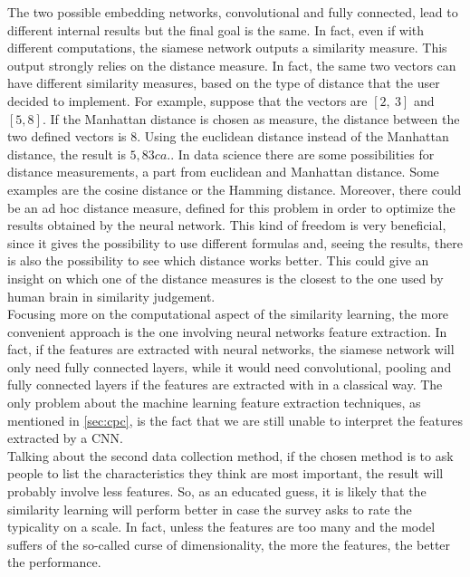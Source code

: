 \documentclass[conference]{IEEEtran}
\begin{document}
			\noindent The two possible embedding networks, convolutional and fully connected, lead to different internal results but the final goal is the same. In fact, even if with different computations, the siamese 
			network outputs a similarity measure. This output strongly relies on the distance measure. In fact, the same two vectors can have different similarity measures, based on the type of distance that the user 
			decided to implement. For example, suppose that the vectors are $[2,\ 3]$ and $[5, 8]$. If the Manhattan distance is chosen as measure, the distance between the two defined vectors is $8$. 
			Using the euclidean distance instead of the Manhattan distance, the result is $5,83 ca.$. In data science there are some possibilities for distance measurements, a part from euclidean and Manhattan distance. Some 
			examples are the cosine distance or the Hamming distance. Moreover, there could be an ad hoc distance measure, defined for this problem in order to optimize the results obtained by the neural network. 
			This kind of freedom is very beneficial, since it gives the possibility to use different formulas and, seeing the results, there is also the possibility to see which distance works better. This could give an 
			insight on which one of the distance measures is the closest to the one used by human brain in similarity judgement. \\
			Focusing more on the computational aspect of the similarity learning, the more convenient approach is the one involving neural networks feature extraction. In fact, if the features are extracted with 
			neural networks, the siamese network will only need fully connected layers, while it would need convolutional, pooling and fully connected layers if the features are extracted with in a classical way. 
			The only problem about the machine learning feature extraction techniques, as mentioned in \ref{sec:cpc}, is the fact that we are still unable to interpret the features extracted by a CNN.\\
			Talking about the second data collection method, if the chosen method is to ask people to list the characteristics they think are most important, the result will probably involve less features. So, as an 
			educated guess, it is likely that the similarity learning will perform better in case the survey asks to rate the typicality on a scale. In fact, unless the features are too many and the model suffers of the 
			so-called curse of dimensionality, the more the features, the better the performance.
			
\end{document}
